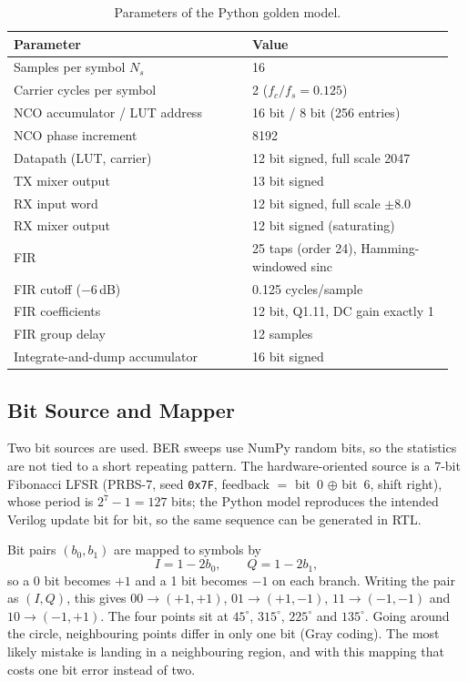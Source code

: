 \documentclass[10pt,twocolumn,letterpaper]{article}
\begin{document}
\begin{table}[t]
\centering\small
\caption{Parameters of the Python golden model.}
\label{tab:params}
\begin{tabular}{@{}p{0.52\linewidth}p{0.44\linewidth}@{}}
\toprule
Parameter & Value \\
\midrule
Samples per symbol $N_s$ & 16 \\
Carrier cycles per symbol & 2 ($f_c/f_s = 0.125$) \\
NCO accumulator / LUT address & 16 bit / 8 bit (256 entries) \\
NCO phase increment & 8192 \\
Datapath (LUT, carrier) & 12 bit signed, full scale 2047 \\
TX mixer output & 13 bit signed \\
RX input word & 12 bit signed, full scale $\pm 8.0$ \\
RX mixer output & 12 bit signed (saturating) \\
FIR & 25 taps (order 24), Hamming-windowed sinc \\
FIR cutoff ($-6$\,dB) & 0.125 cycles/sample \\
FIR coefficients & 12 bit, Q1.11, DC gain exactly 1 \\
FIR group delay & 12 samples \\
Integrate-and-dump accumulator & 16 bit signed \\
\bottomrule
\end{tabular}
\end{table}

\subsection{Bit Source and Mapper}

Two bit sources are used. BER sweeps use NumPy random bits, so the statistics
are not tied to a short repeating pattern. The hardware-oriented source is a
7-bit Fibonacci LFSR (PRBS-7, seed \texttt{0x7F}, feedback $=$ bit~0 $\oplus$
bit~6, shift right), whose period is $2^7-1=127$ bits; the Python model
reproduces the intended Verilog update bit for bit, so the same sequence can
be generated in RTL.

Bit pairs $(b_0,b_1)$ are mapped to symbols by
\begin{equation}
I = 1-2b_0, \qquad Q = 1-2b_1 ,
\end{equation}
so a 0 bit becomes $+1$ and a 1 bit becomes $-1$ on each branch. Writing the
pair as $(I,Q)$, this gives $00\!\to\!(+1,+1)$, $01\!\to\!(+1,-1)$,
$11\!\to\!(-1,-1)$ and $10\!\to\!(-1,+1)$. The four points sit at
$45^\circ$, $315^\circ$, $225^\circ$ and $135^\circ$. Going around the
circle, neighbouring points differ in only one bit (Gray coding). The most
likely mistake is landing in a neighbouring region, and with this mapping
that costs one bit error instead of two.
\end{document}

